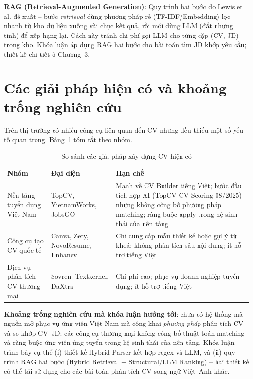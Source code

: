 \documentclass[../DoAn.tex]{subfiles}
\begin{document}
\textbf{RAG (Retrieval-Augmented Generation):} Quy trình hai bước do Lewis et al. \cite{lewis2020rag} đề xuất -- bước \textit{retrieval} dùng phương pháp rẻ (TF-IDF/Embedding) lọc nhanh từ kho dữ liệu xuống vài chục kết quả, rồi mới dùng LLM (đắt nhưng tinh) để xếp hạng lại. Cách này tránh chi phí gọi LLM cho từng cặp (CV, JD) trong kho. Khóa luận áp dụng RAG hai bước cho bài toán tìm JD khớp yêu cầu; thiết kế chi tiết ở Chương~3.

\section{Các giải pháp hiện có và khoảng trống nghiên cứu}

Trên thị trường có nhiều công cụ liên quan đến CV nhưng đều thiếu một số yếu tố quan trọng. Bảng~\ref{tab:comparison} tóm tắt theo nhóm.

\begin{table}[H]
\centering
\caption{So sánh các giải pháp xây dựng CV hiện có}
\label{tab:comparison}
\begin{tabular}{|p{4.0cm}|p{4.0cm}|p{5.5cm}|}
\hline
\textbf{Nhóm} & \textbf{Đại diện} & \textbf{Hạn chế} \\ \hline
Nền tảng tuyển dụng Việt Nam & TopCV, VietnamWorks, JobsGO & Mạnh về CV Builder tiếng Việt; bước đầu tích hợp AI (TopCV CV Scoring 08/2025) nhưng không công bố phương pháp matching; ràng buộc apply trong hệ sinh thái của nền tảng \\ \hline
Công cụ tạo CV quốc tế & Canva, Zety, NovoResume, Enhancv & Chỉ cung cấp mẫu thiết kế hoặc gợi ý từ khoá; không phân tích sâu nội dung; ít hỗ trợ tiếng Việt \\ \hline
Dịch vụ phân tích CV thương mại & Sovren, Textkernel, DaXtra & Chi phí cao; phục vụ doanh nghiệp tuyển dụng; ít hỗ trợ tiếng Việt \\ \hline
\end{tabular}
\end{table}

\textbf{Khoảng trống nghiên cứu mà khóa luận hướng tới}: chưa có hệ thống mã nguồn mở phục vụ ứng viên Việt Nam mà công khai \textit{phương pháp} phân tích CV và so khớp CV--JD: các công cụ thương mại không công bố thuật toán matching và ràng buộc ứng viên ứng tuyển trong hệ sinh thái của nền tảng. Khóa luận trình bày cụ thể (i) thiết kế Hybrid Parser kết hợp regex và LLM, và (ii) quy trình RAG hai bước (Hybrid Retrieval + Structural/LLM Ranking) -- hai thiết kế có thể tái sử dụng cho các bài toán phân tích CV song ngữ Việt--Anh khác.
\end{document}
